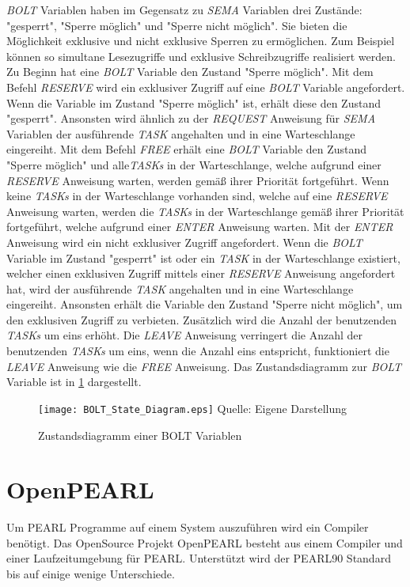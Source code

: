 \emph{BOLT} Variablen haben im Gegensatz zu \emph{SEMA} Variablen drei Zustände:
"gesperrt", "Sperre möglich" und "Sperre nicht
möglich".\autocite[vgl.][125]{PEARL} Sie bieten die Möglichkeit exklusive und
nicht exklusive Sperren zu ermöglichen. Zum Beispiel können so simultane
Lesezugriffe und exklusive Schreibzugriffe realisiert werden. Zu Beginn hat eine
\emph{BOLT} Variable den Zustand "Sperre möglich". Mit dem Befehl \emph{RESERVE}
wird ein exklusiver Zugriff auf eine \emph{BOLT} Variable angefordert. Wenn die
Variable im Zustand "Sperre möglich" ist, erhält diese den Zustand "gesperrt".
Ansonsten wird ähnlich zu der \emph{REQUEST} Anweisung für \emph{SEMA} Variablen
der ausführende \emph{TASK} angehalten und in eine Warteschlange eingereiht. Mit
dem Befehl \emph{FREE} erhält eine \emph{BOLT} Variable den Zustand "Sperre
möglich" und alle\emph{TASKs} in der Warteschlange, welche aufgrund einer
\emph{RESERVE} Anweisung warten, werden gemäß ihrer Priorität fortgeführt. Wenn
keine \emph{TASKs} in der Warteschlange vorhanden sind, welche auf eine
\emph{RESERVE} Anweisung warten, werden die \emph{TASKs} in der Warteschlange
gemäß ihrer Priorität fortgeführt, welche aufgrund einer \emph{ENTER} Anweisung
warten. Mit der \emph{ENTER} Anweisung wird ein nicht exklusiver Zugriff
angefordert. Wenn die \emph{BOLT} Variable im Zustand "gesperrt" ist oder ein
\emph{TASK} in der Warteschlange existiert, welcher einen exklusiven Zugriff
mittels einer \emph{RESERVE} Anweisung angefordert hat, wird der ausführende
\emph{TASK} angehalten und in eine Warteschlange eingereiht. Ansonsten erhält
die Variable den Zustand "Sperre nicht möglich", um den exklusiven Zugriff zu
verbieten. Zusätzlich wird die Anzahl der benutzenden \emph{TASKs} um eins
erhöht. Die \emph{LEAVE} Anweisung verringert die Anzahl der benutzenden
\emph{TASKs} um eins, wenn die Anzahl eins entspricht, funktioniert die
\emph{LEAVE} Anweisung wie die \emph{FREE}
Anweisung.\autocite[vgl.][125-127]{PEARL} Das Zustandsdiagramm zur \emph{BOLT}
Variable ist in \cref{fig:BOLT_StateDiagram} dargestellt.
\begin{figure}[ht]
  \texttt{[image: BOLT\_State\_Diagram.eps]}
  \footnotesize\sffamily Quelle: Eigene Darstellung
  \caption{Zustandsdiagramm einer BOLT Variablen}
  \label{fig:BOLT_StateDiagram}
\end{figure}

\section{OpenPEARL}
\label{section:OpenPEARL}
Um PEARL Programme auf einem System auszuführen wird ein Compiler benötigt. Das
OpenSource Projekt OpenPEARL besteht aus einem Compiler und einer
Laufzeitumgebung für PEARL.\autocite{OpenPEARL_Structure} Unterstützt wird der
PEARL90 Standard bis auf einige wenige
Unterschiede.\autocite{OpenPEARL_Differences_To_PEARL90}

